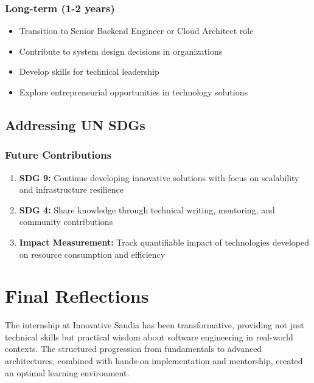 \subsubsection{Long-term (1-2 years)}

\begin{itemize}
    \item Transition to Senior Backend Engineer or Cloud Architect role
    \item Contribute to system design decisions in organizations
    \item Develop skills for technical leadership
    \item Explore entrepreneurial opportunities in technology solutions
\end{itemize}

\subsection{Addressing UN SDGs}

\subsubsection{Future Contributions}

\begin{enumerate}
    \item \textbf{SDG 9:} Continue developing innovative solutions with focus on scalability and infrastructure resilience
    
    \item \textbf{SDG 4:} Share knowledge through technical writing, mentoring, and community contributions
    
    \item \textbf{Impact Measurement:} Track quantifiable impact of technologies developed on resource consumption and efficiency
\end{enumerate}

\section{Final Reflections}

The internship at Innovative Saudia has been transformative, providing not just technical skills but practical wisdom about software engineering in real-world contexts. The structured progression from fundamentals to advanced architectures, combined with hands-on implementation and mentorship, created an optimal learning environment.

